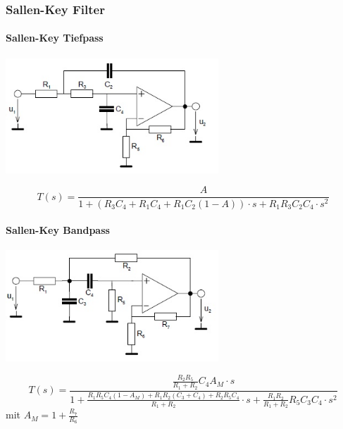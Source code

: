 \subsubsection{Sallen-Key Filter}
\paragraph{Sallen-Key Tiefpass}
\begin{center}
	\includegraphics[width=8cm]{images/filter_sk_tp.jpg}
\end{center}
\begin{equation*}
	T(s) = \frac{A}{1 + \left(R_3 C_4 + R_1 C_4 + R_1 C_2 (1-A)\right) \cdot s + R_1 R_3 C_2 C_4 \cdot s^2}
\end{equation*}

\paragraph{Sallen-Key Bandpass}
\begin{center}
	\includegraphics[width=8cm]{images/filter_sk_bp.jpg}
\end{center}
\begin{equation*}
	T(s) = \frac{\frac{R_2 R_5}{R_1 + R_2} C_4 A_M \cdot s}{1 + \frac{R_1 R_5 C_4 (1-A_M) + R_1 R_2 (C_3 + C_4) + R_2 R_5 C_4}{R_1 + R_2} \cdot s + \frac{R_1 R_2}{R_1 + R_2} R_5 C_3 C_4 \cdot s^2}
\end{equation*}
mit $A_M = 1+\frac{R_7}{R_6}$

